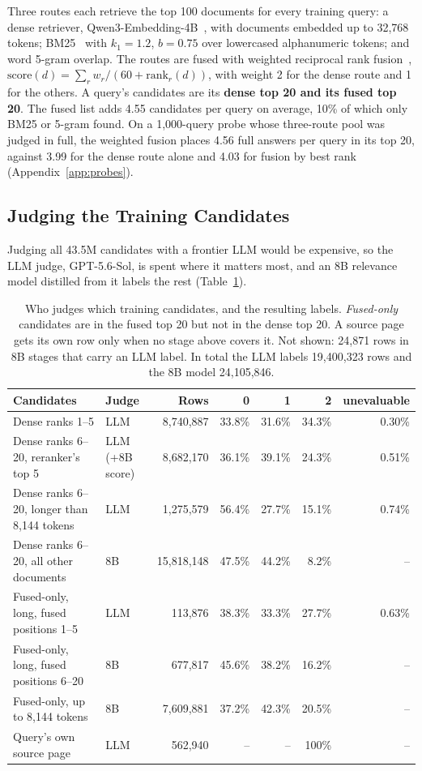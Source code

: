 Three routes each retrieve the top 100 documents for every training query: a dense retriever, Qwen3-Embedding-4B~\citep{zhang2025qwen3embedding}, with documents embedded up to 32,768 tokens; BM25~\citep{robertson2009bm25} with $k_1 = 1.2$, $b = 0.75$ over lowercased alphanumeric tokens; and word 5-gram overlap. The routes are fused with weighted reciprocal rank fusion~\citep{cormack2009rrf}, $\mathrm{score}(d) = \sum_r w_r / (60 + \mathrm{rank}_r(d))$, with weight 2 for the dense route and 1 for the others. A query's candidates are its \textbf{dense top 20 and its fused top 20}. The fused list adds 4.55 candidates per query on average, 10\% of which only BM25 or 5-gram found. On a 1,000-query probe whose three-route pool was judged in full, the weighted fusion places 4.56 full answers per query in its top 20, against 3.99 for the dense route alone and 4.03 for fusion by best rank (Appendix~\ref{app:probes}).

\subsection{Judging the Training Candidates}
\label{sec:judging}

Judging all 43.5M candidates with a frontier LLM would be expensive, so the LLM judge, GPT-5.6-Sol, is spent where it matters most, and an 8B relevance model distilled from it labels the rest (Table~\ref{tab:stages}).

\begin{table}[t]
\centering
\small
\setlength{\tabcolsep}{4.5pt}
\begin{tabular}{llrrrrr}
\toprule
Candidates & Judge & Rows & 0 & 1 & 2 & unevaluable \\
\midrule
Dense ranks 1--5 & LLM & 8,740,887 & 33.8\% & 31.6\% & 34.3\% & 0.30\% \\
Dense ranks 6--20, reranker's top 5 & LLM (+8B score) & 8,682,170 & 36.1\% & 39.1\% & 24.3\% & 0.51\% \\
Dense ranks 6--20, longer than 8,144 tokens & LLM & 1,275,579 & 56.4\% & 27.7\% & 15.1\% & 0.74\% \\
Dense ranks 6--20, all other documents & 8B & 15,818,148 & 47.5\% & 44.2\% & 8.2\% & -- \\
Fused-only, long, fused positions 1--5 & LLM & 113,876 & 38.3\% & 33.3\% & 27.7\% & 0.63\% \\
Fused-only, long, fused positions 6--20 & 8B & 677,817 & 45.6\% & 38.2\% & 16.2\% & -- \\
Fused-only, up to 8,144 tokens & 8B & 7,609,881 & 37.2\% & 42.3\% & 20.5\% & -- \\
Query's own source page & LLM & 562,940 & -- & -- & 100\% & -- \\
\bottomrule
\end{tabular}
\caption{Who judges which training candidates, and the resulting labels. \emph{Fused-only} candidates are in the fused top 20 but not in the dense top 20. A source page gets its own row only when no stage above covers it. Not shown: 24,871 rows in 8B stages that carry an LLM label. In total the LLM labels 19,400,323 rows and the 8B model 24,105,846.}
\label{tab:stages}
\end{table}

